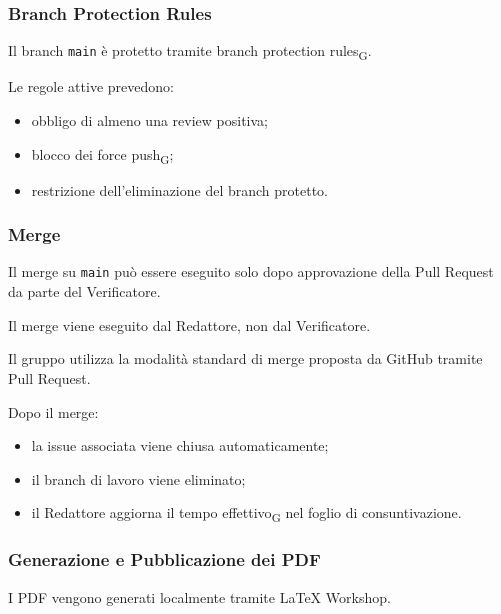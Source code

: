 
\subsubsection{Branch Protection Rules}

Il branch \texttt{main} è protetto tramite branch protection rules\textsubscript{G}.

Le regole attive prevedono:

\begin{itemize}
    \item obbligo di almeno una review positiva;
    \item blocco dei force push\textsubscript{G};
    \item restrizione dell'eliminazione del branch protetto.
\end{itemize}


\subsubsection{Merge}

Il merge su \texttt{main} può essere eseguito solo dopo approvazione della Pull
Request da parte del Verificatore.

Il merge viene eseguito dal Redattore, non dal Verificatore.

Il gruppo utilizza la modalità standard di merge proposta da GitHub tramite Pull
Request.

Dopo il merge:

\begin{itemize}
    \item la issue associata viene chiusa automaticamente;
    \item il branch di lavoro viene eliminato;
    \item il Redattore aggiorna il tempo effettivo\textsubscript{G} nel foglio di consuntivazione.
\end{itemize}


\subsubsection{Generazione e Pubblicazione dei PDF}

I PDF vengono generati localmente tramite LaTeX Workshop.

